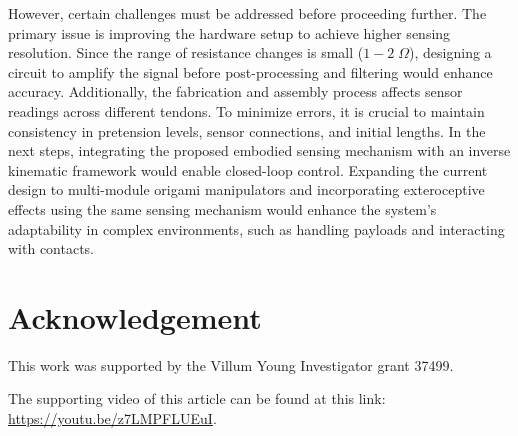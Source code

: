\documentclass[journal, letterpaper]{IEEEtran}
\begin{document}
However, certain challenges must be addressed before proceeding further. The primary issue is improving the hardware setup to achieve higher sensing resolution. Since the range of resistance changes is small ($1-2 \;\Omega$), designing a circuit to amplify the signal before post-processing and filtering would enhance accuracy. Additionally, the fabrication and assembly process affects sensor readings across different tendons. To minimize errors, it is crucial to maintain consistency in pretension levels, sensor connections, and initial lengths. In the next steps, integrating the proposed embodied sensing mechanism with an inverse kinematic framework would enable closed-loop control. Expanding the current design to multi-module origami manipulators and incorporating exteroceptive effects using the same sensing mechanism would enhance the system's adaptability in complex environments, such as handling payloads and interacting with contacts.

\section{Acknowledgement}
This work was supported by the Villum Young Investigator grant 37499.

\appendix
The supporting video of this article can be found at this link: \url{https://youtu.be/z7LMPFLUEuI}.



 
\end{document}
